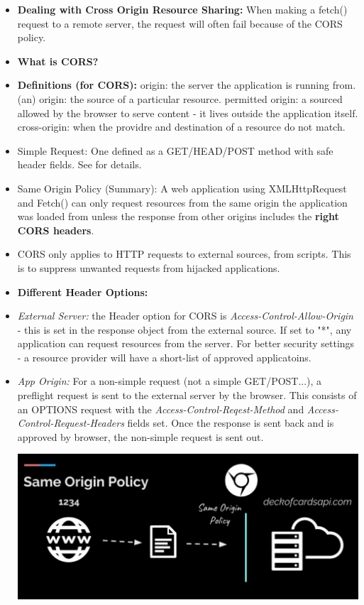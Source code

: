 \documentclass[8pt,a4paper]{extarticle}
\begin{document}
\begin{itemize}
\item \textbf{Dealing with Cross Origin Resource Sharing:} When making a fetch() request to a remote server, the request will often fail because of the CORS policy. 
\item \textbf{What is CORS?}
\item \textbf{Definitions (for CORS):}
\mitem origin: the server the application is running from.
\mitem (an) origin: the source of a particular resource.
\mitem permitted origin: a sourced allowed by the browser to serve content - it lives outside the application itself.
\mitem cross-origin: when the providre and destination of a resource do not match.
\item Simple Request: One defined as a GET/HEAD/POST method with safe header fields. See \cite{cors} for details.
\item Same Origin Policy (Summary): A web application using XMLHttpRequest and Fetch() can only request resources from the same origin the application was loaded from unless the response from other origins includes the \textbf{right CORS headers}.
\item CORS only applies to HTTP requests to external sources, from scripts. This is to suppress unwanted requests from hijacked applications.
\item \textbf{Different Header Options:}
\item \textit{External Server:} the Header option for CORS is \textit{Access-Control-Allow-Origin} - this is set in the response object from the external source. If set to "*", any application can request resources from the server. For better security settings - a resource provider will have a short-list of approved applicatoins.
\item \textit{App Origin:} For a non-simple request (not a simple GET/POST...), a preflight request is sent to the external server by the browser. This consists of an OPTIONS request with the \textit{Access-Control-Reqest-Method} and \textit{Access-Control-Request-Headers} fields set. Once the response is sent back and is approved by browser, the non-simple request is sent out.

\includegraphics[scale=0.22]{cors.png}



 
\end{itemize}
\end{document}
